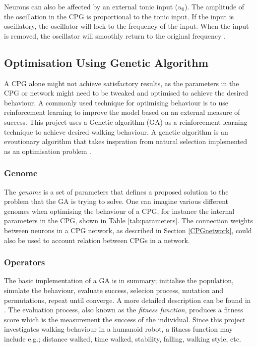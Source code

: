 Neurons can also be affected by an external tonic input ($u_0$). The amplitude of the oscillation in the CPG is proportional to the tonic input. If the input is oscillatory, the oscillator will lock to the frequency of the input. When the input is removed, the oscillator will smoothly return to the original frequency \cite{CPGwolff}.


\subsection{Optimisation Using Genetic Algorithm}
A CPG alone might not achieve satisfactory results, as the parameters in the CPG or network might need to be tweaked and optimised to achieve the desired behaviour. A commonly used technique for optimising behaviour is to use reinforcement learning to improve the model based on an external measure of success. This project uses a Genetic algorithm (GA) as a reinforcement learning technique to achieve desired walking behaviour. A genetic algorithm is an evoutionary algorithm that takes inspration from natural selection implemented as an optimisation problem \cite{GAHauert}. 


\subsubsection{Genome}


The \textit{genome} is a set of parameters that defines a proposed solution to the problem that the GA is trying to solve. One can imagine various different genomes when optimising the behaviour of a CPG, for instance the internal parameters in the CPG, shown in Table \ref{tab:parameters}. The connection weights between neurons in a CPG network, as described in Section \ref{CPGnetwork}, could also be used to account relation between CPGs in a network.

\subsubsection{Operators}
The basic implementation of a GA is in summary; initialise the population, simulate the behaviour, evaluate success, selecion process, mutation and permutations, repeat until converge. A more detailed description can be found in \cite{wahde}. The evaluation process, also known as the \textit{fitness function}, produces a fitness score which is the measurement the success of the individual. Since this project investigates walking behaviour in a humanoid robot, a fitness function may include e.g.; distance walked, time walked, stability, falling, walking style, etc.